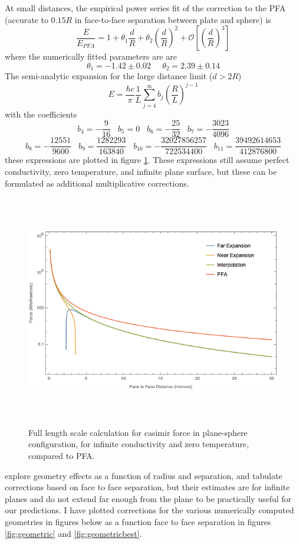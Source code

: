 \documentclass[11pt,traditabstract]{article}
\begin{document}
At small distances, the empirical power series fit of the correction to the PFA (accurate to $0.15R$ in face-to-face separation between plate and sphere) is
$$
\frac{E}{E_{PFA}}=1+\theta_1\frac{d}{R}+\theta_2\left(\frac{d}{R}\right)^2+\mathcal{O}\left[\left(\frac{d}{R}\right)^3\right]
$$
where the numerically fitted parameters are \citep{Emig07} are
$$
\theta_1=-1.42\pm0.02 \;\;\;\;\; \theta_2=2.39\pm0.14
$$
The semi-analytic expansion for the large distance limit ($d>2R$)
$$
E=\frac{\hbar c}{\pi}\frac{1}{L}\sum_{j=4}^\infty b_j\left(\frac{R}{L}\right)^{j-1}
$$
with the coefficients
$$
b_4=-\frac{9}{16} \;\;\; b_5=0 \;\;\; b_6=-\frac{25}{32} \;\;\; b_7=-\frac{3023}{4096}
$$
$$
b_8=-\frac{12551}{9600} \;\;\; b_9=\frac{1282293}{163840} \;\;\; b_{10}=-\frac{32027856257}{722534400} \;\;\; b_{11}=\frac{39492614653}{412876800}
$$
these expressions are plotted in figure \ref{fig:expansion}. These expressions still assume perfect conductivity, zero temperature, and infinite plane surface, but these can be formulated as additional multiplicative corrections.

\begin{figure}[!h]
\centering
\includegraphics[height=4in]{analytical}
\caption{Full length scale calculation for casimir force in plane-sphere configuration, for infinite conductivity and zero temperature, compared to PFA.}\label{fig:expansion}
\end{figure}

\citet{Durand} explore geometry effects as a function of radius and separation, and tabulate corrections based on face to face separation, but their estimates are for infinite planes and do not extend far enough from the plane to be practically useful for our predictions. I have plotted corrections for the various numerically computed geometries in figures below as a function face to face separation in figures \ref{fig:geometric} and \ref{fig:geometricbest}.
\end{document}
